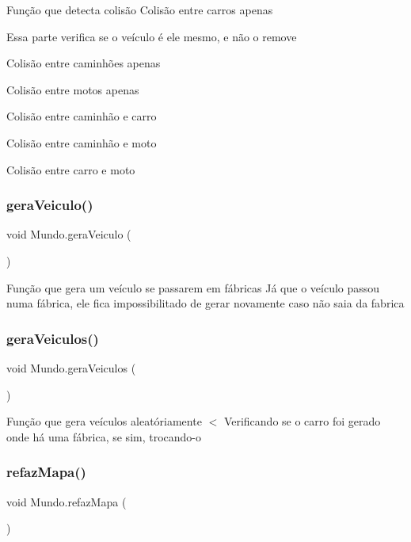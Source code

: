 Função que detecta colisão Colisão entre carros apenas

Essa parte verifica se o veículo é ele mesmo, e não o remove

Colisão entre caminhões apenas

Colisão entre motos apenas

Colisão entre caminhão e carro

Colisão entre caminhão e moto

Colisão entre carro e moto \mbox{\label{classMundo_a96be554c9f3734a55b27b10bae5f6527}} 
\subsubsection{\texorpdfstring{gera\+Veiculo()}{geraVeiculo()}}
{\footnotesize\ttfamily void Mundo.\+gera\+Veiculo (\begin{DoxyParamCaption}{ }\end{DoxyParamCaption})\hspace{0.3cm}{\ttfamily [inline]}}

Função que gera um veículo se passarem em fábricas Já que o veículo passou numa fábrica, ele fica impossibilitado de gerar novamente caso não saia da fabrica \mbox{\label{classMundo_a6793ddedae676faa577ac3545dc4a190}} 
\subsubsection{\texorpdfstring{gera\+Veiculos()}{geraVeiculos()}}
{\footnotesize\ttfamily void Mundo.\+gera\+Veiculos (\begin{DoxyParamCaption}{ }\end{DoxyParamCaption})\hspace{0.3cm}{\ttfamily [inline]}}

Função que gera veículos aleatóriamente $<$ Verificando se o carro foi gerado onde há uma fábrica, se sim, trocando-\/o \mbox{\label{classMundo_a500511141a45b1b95301612109703f02}} 
\subsubsection{\texorpdfstring{refaz\+Mapa()}{refazMapa()}}
{\footnotesize\ttfamily void Mundo.\+refaz\+Mapa (\begin{DoxyParamCaption}{ }\end{DoxyParamCaption})\hspace{0.3cm}{\ttfamily [inline]}}

